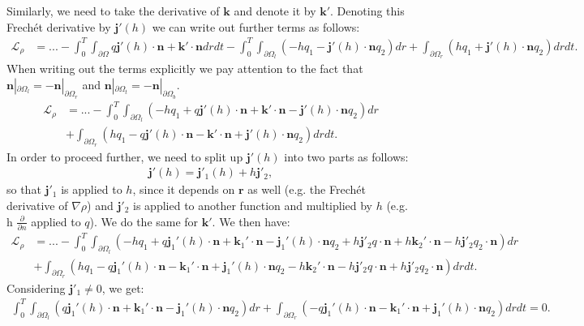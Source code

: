 \documentclass[11pt, a4paper]{article}
\theoremstyle{definition}
\newcommand{\n}{\mathbf{n}}
\newcommand{\jf}{\mathbf j}
\begin{document}
Similarly, we need to take the derivative of $\mathbf k$ and denote it by $\mathbf{k}'$.
Denoting this Frech\'et derivative by $\jf'(h)$ we can write out further terms as follows:
\begin{align*}
	\mathcal{L}_\rho &= ... - \int_0^T \int_{\partial \Omega} q \jf'(h)   \cdot \n + \mathbf{k}' \cdot \n dr dt - \int_0^T \int_{\partial \Omega_l} \left(- h q_1 - \jf'(h)  \cdot \n q_2 \right)   dr  + \int_{\partial \Omega_r} \left(h q_1 + \jf'(h)  \cdot \n q_2 \right)   dr dt. 
\end{align*}
When writing out the terms explicitly we pay attention to the fact that $\n|_{\partial \Omega_l} = - \n|_{\partial \Omega_r}$ and $\n|_{\partial \Omega_t} = - \n|_{\partial \Omega_b}$.
\begin{align*}
	\mathcal{L}_\rho &= ... - \int_0^T \int_{\partial \Omega_l} \left(- h q_1 + q \jf'(h)   \cdot \n  + \mathbf{k}' \cdot \n- \jf'(h)  \cdot \n q_2 \right)   dr  \\
	&+ \int_{\partial \Omega_r} \left(h q_1 - q \jf'(h)   \cdot \n - \mathbf{k}' \cdot \n+ \jf'(h)  \cdot \n q_2 \right)   dr dt .
\end{align*}
In order to proceed further, we need to split up $\jf'(h)$ into two parts as follows:
\begin{align*}
	\jf'(h) = \jf'_1(h) + h \jf'_2,
\end{align*}
so that $\jf'_1$ is applied to $h$, since it depends on $\mathbf{r}$ as well (e.g. the Frech\'et derivative of $\nabla \rho$) and $\jf'_2$ is applied to another function and multiplied by $h$ (e.g. h $\frac{\partial }{\partial n}$ applied to $q$). We do the same for $\mathbf k'$.
We then have:
\begin{align*}
	\mathcal{L}_\rho &= ... - \int_0^T \int_{\partial \Omega_l} \left(- h q_1 + q \jf_1'(h)   \cdot \n + \mathbf{k}_1' \cdot \n - \jf_1'(h)  \cdot \n q_2  + h \jf'_2 q \cdot \n + h \mathbf{k}_2' \cdot \n-  h \jf'_2 q_2 \cdot \n \right)   dr  \\
	&+ \int_{\partial \Omega_r} \left( h q_1 - q \jf_1'(h)   \cdot \n -\mathbf{k}_1' \cdot \n+ \jf_1'(h)  \cdot \n q_2 - h\mathbf{k}_2' \cdot \n - h \jf'_2 q \cdot \n +  h \jf'_2 q_2 \cdot \n \right)   dr dt.
\end{align*}
Considering $\jf'_1 \neq 0$, we get:
\begin{align*}
	\int_0^T \int_{\partial \Omega_l} \left( q \jf_1'(h)   \cdot \n  + \mathbf{k}_1' \cdot \n - \jf_1'(h)  \cdot \n q_2  \right)   dr  + \int_{\partial \Omega_r} \left(-q \jf_1'(h)   \cdot \n - \mathbf{k}_1' \cdot \n + \jf_1'(h)  \cdot \n q_2  \right)   dr dt = 0 .
\end{align*}
\end{document}
